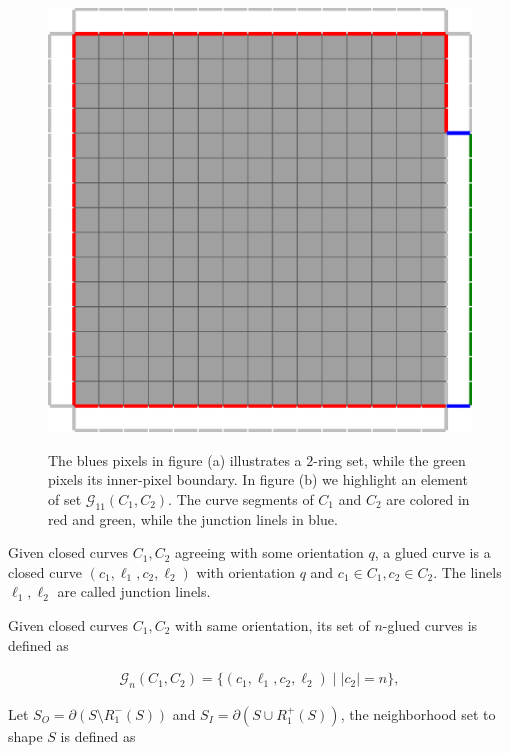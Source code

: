 \documentclass[runningheads]{llncs}
\begin{document}
\begin{figure}
{	\includegraphics[scale=0.2]{images/local_search/definitions/glued-curve.eps}
	}%
	\caption{The blues pixels in figure (a) illustrates a $2$-ring set, while the green pixels its inner-pixel boundary. In figure (b) we highlight an element of set $\mathcal{G}_{11}(C_1,C_2)$. The curve segments of $C_1$ and $C_2$ are colored in red and green, while the junction linels in blue.}
\end{figure}

\begin{definition}
Given closed curves $C_1,C_2$ agreeing with some orientation $q$, a glued curve is a closed curve  $(c_1,\ell_1,c_2,\ell_2)$ with orientation $q$ and $c_1 \in C_1, c_2 \in C_2$. The linels $\ell_1,\ell_2$ are called junction linels.
\end{definition}

\begin{definition}
Given closed curves $C_1,C_2$ with same orientation, its set of $n$-glued curves is defined as

\begin{align*}
	\mathcal{G}_n(C_1,C_2) = \{ (c_1,\ell_1,c_2,\ell_2) \; | \; |c_2|=n \},
\end{align*}
\end{definition}

Let $S_O = \partial ( S \setminus R_1^-(S) ) $ and $S_I = \partial ( S \cup R_1^+(S) )$, the neighborhood set to shape $S$ is defined as
\end{document}
